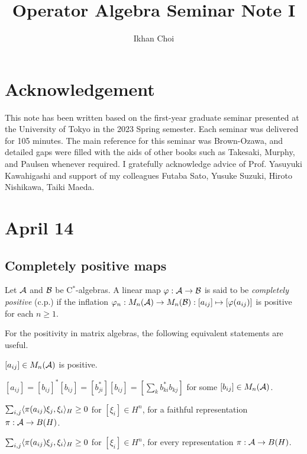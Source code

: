 \documentclass{../../small}
\begin{document}
\title{Operator Algebra Seminar Note I}
\author{Ikhan Choi}
\maketitle
\tableofcontents


\section*{Acknowledgement}
This note has been written based on the first-year graduate seminar presented at the University of Tokyo in the 2023 Spring semester.
Each seminar was delivered for 105 minutes.
The main reference for this seminar was Brown-Ozawa, and detailed gaps were filled with the aids of other books such as Takesaki, Murphy, and Paulsen whenever required.
I gratefully acknowledge advice of Prof. Yasuyuki Kawahigashi and support of my colleagues Futaba Sato, Yusuke Suzuki, Hiroto Nishikawa, Taiki Maeda.



\newpage
\section{April 14}

\subsection{Completely positive maps}

\begin{defn}
Let $\mathcal{A}$ and $\mathcal{B}$ be C$^*$-algebras.
A linear map $\varphi:\mathcal{A}\to\mathcal{B}$ is said to be \emph{completely positive} (c.p.) if the inflation $\varphi_n:M_n(\mathcal{A})\to M_n(\mathcal{B}):[a_{ij}]\mapsto[\varphi(a_{ij})]$ is positive for each $n\ge1$.
\end{defn}

\begin{rmk}
For the positivity in matrix algebras, the following equivalent statements are useful.
\begin{parts}
\item $[a_{ij}]\in M_n(\mathcal{A})$ is positive.
\item $[a_{ij}]=[b_{ij}]^*[b_{ij}]=[b_{ji}^*][b_{ij}]=[\sum_kb_{ki}^*b_{kj}]$ for some $[b_{ij}]\in M_n(\mathcal{A})$.
\item $\sum_{i,j}\langle\pi(a_{ij})\xi_j,\xi_i\rangle_H\ge0$ for $[\xi_i]\in H^n$, for a faithful representation $\pi:\mathcal{A}\to B(H)$.
\item $\sum_{i,j}\langle\pi(a_{ij})\xi_j,\xi_i\rangle_H\ge0$ for $[\xi_i]\in H^n$, for every representation $\pi:\mathcal{A}\to B(H)$.
\end{parts}
\end{rmk}
\end{document}
